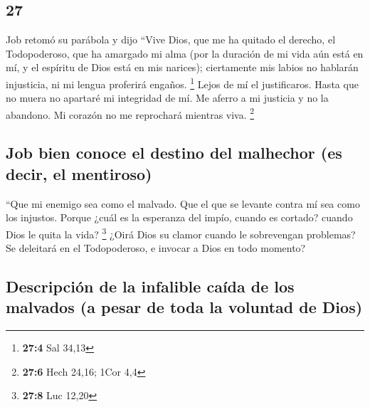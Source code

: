 \begin{paracol}{2}
{\section{27}\label{section-52}}

 Job retomó su parábola y dijo  ``Vive Dios,
que me ha quitado el derecho, el Todopoderoso, que ha amargado mi alma
 (por la duración de mi vida aún está en mí, y el espíritu
de Dios está en mis narices);  ciertamente mis labios no
hablarán injusticia, ni mi lengua proferirá engaños. \footnote{\textbf{27:4}
  Sal 34,13}  Lejos de mí el justificaros. Hasta que no
muera no apartaré mi integridad de mí.  Me aferro a mi
justicia y no la abandono. Mi corazón no me reprochará mientras viva.
\footnote{\textbf{27:6} Hech 24,16; 1Cor 4,4}

\hypertarget{job-bien-conoce-el-destino-del-malhechor-es-decir-el-mentiroso}{%
\subsection{Job bien conoce el destino del malhechor (es decir, el
mentiroso)}\label{job-bien-conoce-el-destino-del-malhechor-es-decir-el-mentiroso}}

 ``Que mi enemigo sea como el malvado. Que el que se
levante contra mí sea como los injustos.  Porque ¿cuál es
la esperanza del impío, cuando es cortado? cuando Dios le quita la vida?
\footnote{\textbf{27:8} Luc 12,20}  ¿Oirá Dios su clamor
cuando le sobrevengan problemas?  Se deleitará en el
Todopoderoso, e invocar a Dios en todo momento?

\hypertarget{descripciuxf3n-de-la-infalible-cauxedda-de-los-malvados-a-pesar-de-toda-la-voluntad-de-dios}{%
\subsection{Descripción de la infalible caída de los malvados (a pesar
de toda la voluntad de
Dios)}\label{descripciuxf3n-de-la-infalible-cauxedda-de-los-malvados-a-pesar-de-toda-la-voluntad-de-dios}}


\end{paracol}
